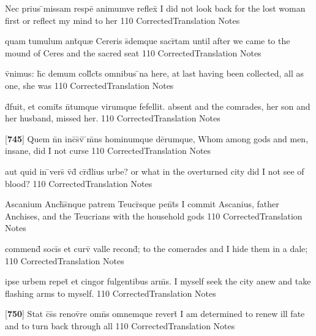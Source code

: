 \latline
  {Nec prius \={}missam respe\={\macron {\i}} animumve reflex\={\macron {\i}}}
  { I did not look back for the lost woman first or reflect my mind to her }
  {110}
  { CorrectedTranslation }
  { Notes }


\latline
  {quam tumulum ant\={\macron {\i}}qu{\ae} Cereris s\={}demque sacr\={}tam}
  { until after we came to the mound of Ceres and the sacred seat }
  {110}
  { CorrectedTranslation }
  { Notes }


\latline
  {v\={}nimus: h\={\macron {\i}}c demum coll\={}ct\={\macron {\i}}s omnibus \={}na}
  { here, at last having been collected, all as one, she was  }
  {110}
  { CorrectedTranslation }
  { Notes }


\latline
  {d\={}fuit, et comit\={}s n\={}tumque virumque fefellit.}
  { absent and the comrades, her son and her husband, missed her. }
  {110}
  { CorrectedTranslation }
  { Notes }


\latline
  {[\textbf{745}] Quem n\={}n inc\={}s\={}v\={\macron {\i}} \={}m\={}ns hominumque de\={}rumque,}
  { Whom among gods and men, insane, did I not curse }
  {110}
  { CorrectedTranslation }
  { Notes }


\latline
  {aut quid in \={}vers\={} v\={\macron {\i}}d\={\macron {\i}} cr\={}d\={}lius urbe?}
  { or what in the overturned city did I not see of blood? }
  {110}
  { CorrectedTranslation }
  { Notes }


\latline
  {Ascanium Anch\={\macron {\i}}s\={}nque patrem Teucr\={}sque pen\={}t\={\macron {\i}}s}
  { I commit Ascanius, father Anchises, and the Teucrians with the household gods  }
  {110}
  { CorrectedTranslation }
  { Notes }


\latline
  {commend\={} soci\={\macron {\i}}s et curv\={} valle recond\={};}
  { to the comerades and I hide them in a dale; }
  {110}
  { CorrectedTranslation }
  { Notes }


\latline
  {ipse urbem repet\={} et cingor fulgentibus arm\={\macron {\i}}s.}
  { I myself seek the city anew and take flashing arms to myself. }
  {110}
  { CorrectedTranslation }
  { Notes }


\latline
  {[\textbf{750}] Stat c\={}s\={}s renov\={}re omn\={\macron {\i}}s omnemque revert\={\macron {\i}}}
  { I am determined to renew ill fate and to turn back through all  }
  {110}
  { CorrectedTranslation }
  { Notes }


